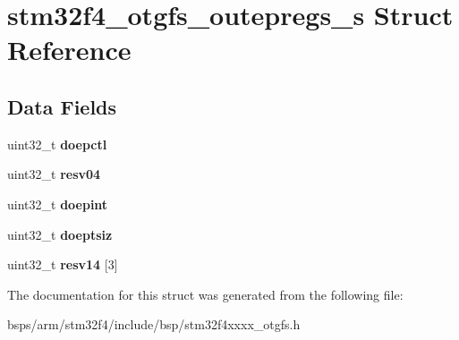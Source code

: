 \hypertarget{structstm32f4__otgfs__outepregs__s}{}\section{stm32f4\+\_\+otgfs\+\_\+outepregs\+\_\+s Struct Reference}
\label{structstm32f4__otgfs__outepregs__s}
\subsection*{Data Fields}
\begin{DoxyCompactItemize}
\item 
\mbox{\label{structstm32f4__otgfs__outepregs__s_affaf8a3b6b818c62e0e1d2a8e3b554b8}} 
uint32\+\_\+t {\bfseries doepctl}
\item 
\mbox{\label{structstm32f4__otgfs__outepregs__s_ad928a63cc3ac1260c2f41f72bcff9184}} 
uint32\+\_\+t {\bfseries resv04}
\item 
\mbox{\label{structstm32f4__otgfs__outepregs__s_a5fea204271686b69a6ecf45e63009ec2}} 
uint32\+\_\+t {\bfseries doepint}
\item 
\mbox{\label{structstm32f4__otgfs__outepregs__s_a336cefa2706bfc2ccaa9434a577c147b}} 
uint32\+\_\+t {\bfseries doeptsiz}
\item 
\mbox{\label{structstm32f4__otgfs__outepregs__s_a04d7f8855d3ed66c805b4fb74bddf76e}} 
uint32\+\_\+t {\bfseries resv14} \mbox{[}3\mbox{]}
\end{DoxyCompactItemize}


The documentation for this struct was generated from the following file\+:\begin{DoxyCompactItemize}
\item 
bsps/arm/stm32f4/include/bsp/stm32f4xxxx\+\_\+otgfs.\+h\end{DoxyCompactItemize}

